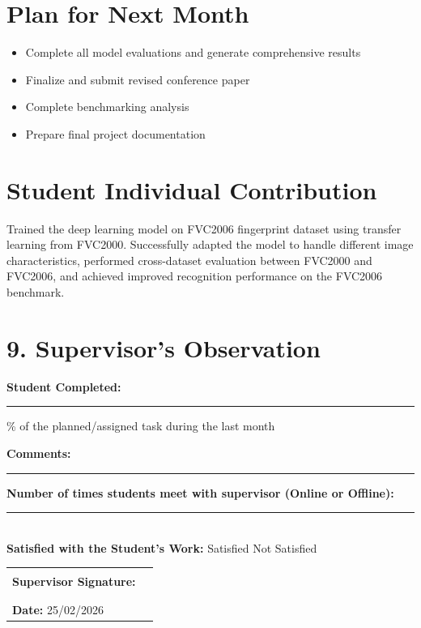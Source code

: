 \documentclass[12pt,a4paper]{article}
\begin{document}
\section{Plan for Next Month}
\begin{itemize}[leftmargin=*]
    \item Complete all model evaluations and generate comprehensive results
    \item Finalize and submit revised conference paper
    \item Complete benchmarking analysis
    \item Prepare final project documentation
\end{itemize}


\section{Student Individual Contribution}
Trained the deep learning model on FVC2006 fingerprint dataset using transfer learning from FVC2000. Successfully adapted the model to handle different image characteristics, performed cross-dataset evaluation between FVC2000 and FVC2006, and achieved improved recognition performance on the FVC2006 benchmark.

\section*{9. Supervisor's Observation}

\noindent\textbf{Student Completed:} \rule{3cm}{0.4pt}\% 
of the planned/assigned task during the last month

\vspace{0.5cm}

\noindent\textbf{Comments:}

\vspace{2cm}
\noindent\rule{\textwidth}{0.4pt}

\vspace{0.5cm}

\noindent\textbf{Number of times students meet with supervisor (Online or Offline):} \rule{1cm}{0.4pt} \\

\noindent\textbf{Satisfied with the Student's Work:} 
\hspace{0.5cm}  Satisfied 
\hspace{1cm}  Not Satisfied

\vspace{0.5cm}



\vspace{1.5cm}

\noindent\begin{tabular}{p{7cm} p{6cm}}
\textbf{Supervisor Signature:} & \rule{5cm}{0.4pt} \\
\\

\textbf{Date:} 25/02/2026
\end{tabular}

\vspace{0.8cm}
\end{document}
